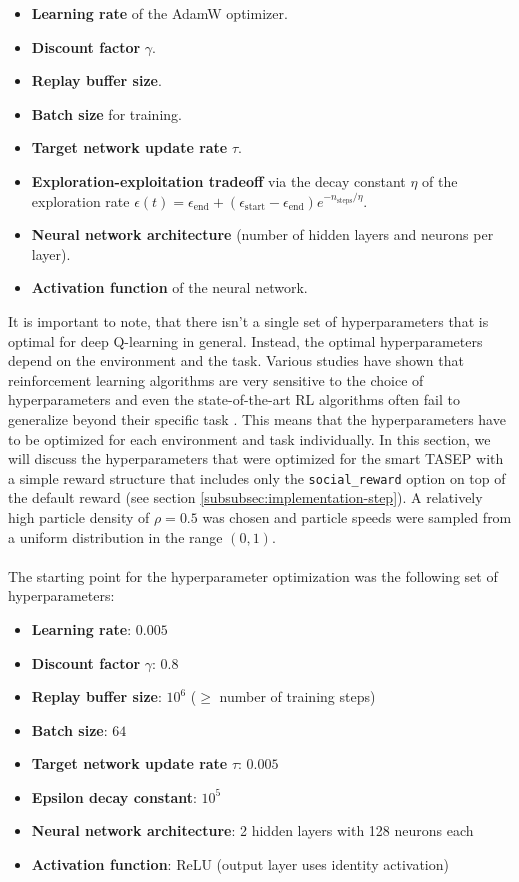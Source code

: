 \begin{itemize}
    \item \textbf{Learning rate} of the AdamW optimizer.
    \item \textbf{Discount factor} $\gamma$.
    \item \textbf{Replay buffer size}.
    \item \textbf{Batch size} for training.
    \item \textbf{Target network update rate} $\tau$.
    \item \textbf{Exploration-exploitation tradeoff} via the decay constant $\eta$ of the exploration rate $\epsilon(t)=\epsilon_{\text{end}} + (\epsilon_{\text{start}} - \epsilon_{\text{end}}) e^{-n_{\text{steps}}/\eta}$.
    \item \textbf{Neural network architecture} (number of hidden layers and neurons per layer).
    \item \textbf{Activation function} of the neural network.
\end{itemize}
It is important to note, that there isn't a single set of hyperparameters that is optimal for deep Q-learning in general. Instead, the optimal hyperparameters depend on the environment and the task. Various studies have shown that reinforcement learning algorithms are very sensitive to the choice of hyperparameters and even the state-of-the-art RL algorithms often fail to generalize beyond their specific task \cite{parker-holder_automated_2022,henderson_deep_2019,engstrom_implementation_2020,andrychowicz_what_2020}. This means that the hyperparameters have to be optimized for each environment and task individually. In this section, we will discuss the hyperparameters that were optimized for the smart TASEP with a simple reward structure that includes only the \texttt{social\_reward} option on top of the default reward (see section \ref{subsubsec:implementation-step}). A relatively high particle density of $\rho=0.5$ was chosen and particle speeds were sampled from a uniform distribution in the range $(0, 1)$.
\\
\\
The starting point for the hyperparameter optimization was the following set of hyperparameters:
\begin{itemize}
    \item \textbf{Learning rate}: $0.005$
    \item \textbf{Discount factor} $\gamma$: $0.8$
    \item \textbf{Replay buffer size}: $10^6$ ($\geq$ number of training steps)
    \item \textbf{Batch size}: $64$
    \item \textbf{Target network update rate} $\tau$: $0.005$
    \item \textbf{Epsilon decay constant}: $10^5$ 
    \item \textbf{Neural network architecture}: 2 hidden layers with 128 neurons each
    \item \textbf{Activation function}: ReLU (output layer uses identity activation)
\end{itemize}
